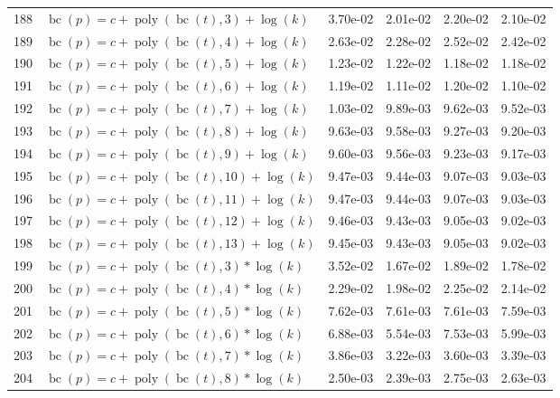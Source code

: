 \documentclass[12pt,a4paper]{article}
\DeclareMathOperator{\bc}{bc}
\DeclareMathOperator{\poly}{poly}
\begin{document}
\begin{longtable}[t]{ll>{\raggedleft\arraybackslash}p{2cm}>{\raggedleft\arraybackslash}p{2cm}>{\raggedleft\arraybackslash}p{2cm}>{\raggedleft\arraybackslash}p{2cm}}
188 & $\bc(p) = c + \poly\left( \bc(t), 3 \right) + \log(k)$ & 3.70e-02 & 2.01e-02 & 2.20e-02 & 2.10e-02\\
\rowcolor{gray!6}  189 & $\bc(p) = c + \poly\left( \bc(t), 4 \right) + \log(k)$ & 2.63e-02 & 2.28e-02 & 2.52e-02 & 2.42e-02\\
190 & $\bc(p) = c + \poly\left( \bc(t), 5 \right) + \log(k)$ & 1.23e-02 & 1.22e-02 & 1.18e-02 & 1.18e-02\\
\rowcolor{gray!6}  191 & $\bc(p) = c + \poly\left( \bc(t), 6 \right) + \log(k)$ & 1.19e-02 & 1.11e-02 & 1.20e-02 & 1.10e-02\\
192 & $\bc(p) = c + \poly\left( \bc(t), 7 \right) + \log(k)$ & 1.03e-02 & 9.89e-03 & 9.62e-03 & 9.52e-03\\
\rowcolor{gray!6}  193 & $\bc(p) = c + \poly\left( \bc(t), 8 \right) + \log(k)$ & 9.63e-03 & 9.58e-03 & 9.27e-03 & 9.20e-03\\
194 & $\bc(p) = c + \poly\left( \bc(t), 9 \right) + \log(k)$ & 9.60e-03 & 9.56e-03 & 9.23e-03 & 9.17e-03\\
\rowcolor{gray!6}  195 & $\bc(p) = c + \poly\left( \bc(t), 10 \right) + \log(k)$ & 9.47e-03 & 9.44e-03 & 9.07e-03 & 9.03e-03\\
196 & $\bc(p) = c + \poly\left( \bc(t), 11 \right) + \log(k)$ & 9.47e-03 & 9.44e-03 & 9.07e-03 & 9.03e-03\\
\rowcolor{gray!6}  197 & $\bc(p) = c + \poly\left( \bc(t), 12 \right) + \log(k)$ & 9.46e-03 & 9.43e-03 & 9.05e-03 & 9.02e-03\\
198 & $\bc(p) = c + \poly\left( \bc(t), 13 \right) + \log(k)$ & 9.45e-03 & 9.43e-03 & 9.05e-03 & 9.02e-03\\
\rowcolor{gray!6}  199 & $\bc(p) = c + \poly\left( \bc(t), 3 \right) * \log(k)$ & 3.52e-02 & 1.67e-02 & 1.89e-02 & 1.78e-02\\
200 & $\bc(p) = c + \poly\left( \bc(t), 4 \right) * \log(k)$ & 2.29e-02 & 1.98e-02 & 2.25e-02 & 2.14e-02\\
\rowcolor{gray!6}  201 & $\bc(p) = c + \poly\left( \bc(t), 5 \right) * \log(k)$ & 7.62e-03 & 7.61e-03 & 7.61e-03 & 7.59e-03\\
202 & $\bc(p) = c + \poly\left( \bc(t), 6 \right) * \log(k)$ & 6.88e-03 & 5.54e-03 & 7.53e-03 & 5.99e-03\\
\rowcolor{gray!6}  203 & $\bc(p) = c + \poly\left( \bc(t), 7 \right) * \log(k)$ & 3.86e-03 & 3.22e-03 & 3.60e-03 & 3.39e-03\\
204 & $\bc(p) = c + \poly\left( \bc(t), 8 \right) * \log(k)$ & 2.50e-03 & 2.39e-03 & 2.75e-03 & 2.63e-03\\

\end{longtable}
\end{document}
